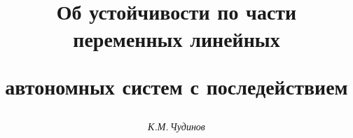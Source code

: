 

 




 


\newcommand{\rank}{\operatorname{rank}} 


\newcommand{\re}{\operatorname{Re}} 


\newcommand{\im}{\operatorname{Im}} 


\newcommand{\tts}[1]{} 


\renewcommand{\baselinestretch}{0.96}


 


 




\setcounter{page}{72} 












 


\author{\it К.М.\,Чудинов} 




\title{Об устойчивости по части переменных линейных  


автономных систем с последействием} 


 


\date{} 




\pagestyle{plain} %


 





